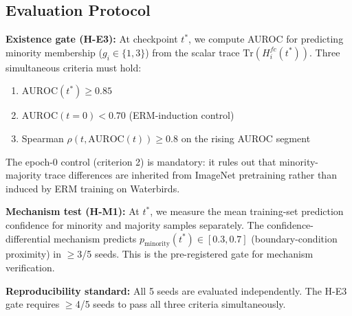 \subsection{Evaluation Protocol}
\label{sec:epoch0}

\textbf{Existence gate (H-E3):} At checkpoint $t^*$, we compute AUROC for predicting minority membership ($g_i \in \{1,3\}$) from the scalar trace $\text{Tr}(H_i^{fc}(t^*))$. Three simultaneous criteria must hold:
\begin{enumerate}
\item $\text{AUROC}(t^*) \geq 0.85$
\item $\text{AUROC}(t{=}0) < 0.70$ (ERM-induction control)
\item Spearman $\rho(t, \text{AUROC}(t)) \geq 0.8$ on the rising AUROC segment
\end{enumerate}

The epoch-0 control (criterion 2) is mandatory: it rules out that minority-majority trace differences are inherited from ImageNet pretraining rather than induced by ERM training on Waterbirds.

\textbf{Mechanism test (H-M1):} At $t^*$, we measure the mean training-set prediction confidence for minority and majority samples separately. The confidence-differential mechanism predicts $p_{\text{minority}}(t^*) \in [0.3, 0.7]$ (boundary-condition proximity) in $\geq$3/5 seeds. This is the pre-registered gate for mechanism verification.

\textbf{Reproducibility standard:} All 5 seeds are evaluated independently. The H-E3 gate requires $\geq$4/5 seeds to pass all three criteria simultaneously.
